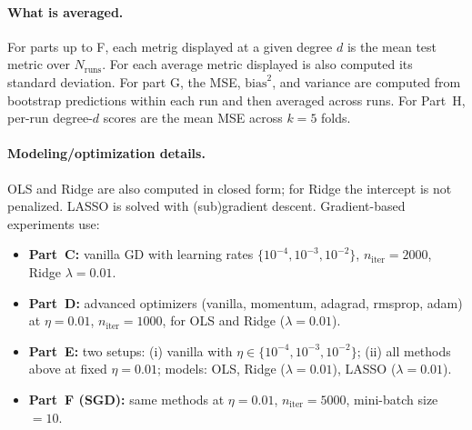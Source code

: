 \documentclass[
 reprint,            %
 amsmath,amssymb,
 aps,
]{revtex4-2}
\begin{document}
\paragraph*{What is averaged.}
For parts up to F, each metrig displayed at a given degree $d$ is the mean test metric over $N_{\text{runs}}$. For each average metric displayed is also computed its standard deviation. For part G, the MSE, $\mathrm{bias}^2$, and variance are computed from bootstrap predictions within each run and then averaged across runs. For Part~H, per-run degree-$d$ scores are the mean MSE across $k=5$ folds.

\paragraph*{Modeling/optimization details.}
OLS and Ridge are also computed in closed form; for Ridge the intercept is not penalized. LASSO is solved with (sub)gradient descent. Gradient-based experiments use:
\begin{itemize}
    \item \textbf{Part~C:} vanilla GD with learning rates $\{10^{-4},10^{-3},10^{-2}\}$, $n_{\text{iter}}=2000$, Ridge $\lambda=0.01$.
    \item \textbf{Part~D:} advanced optimizers (vanilla, momentum, adagrad, rmsprop, adam) at $\eta=0.01$, $n_{\text{iter}}=1000$, for OLS and Ridge ($\lambda=0.01$).
    \item \textbf{Part~E:} two setups: (i) vanilla with $\eta\in\{10^{-4},10^{-3},10^{-2}\}$; (ii) all methods above at fixed $\eta=0.01$; models: OLS, Ridge ($\lambda=0.01$), LASSO ($\lambda=0.01$).
    \item \textbf{Part~F (SGD):} same methods at $\eta=0.01$, $n_{\text{iter}}=5000$, mini-batch size $=10$.
\end{itemize}
\end{document}

